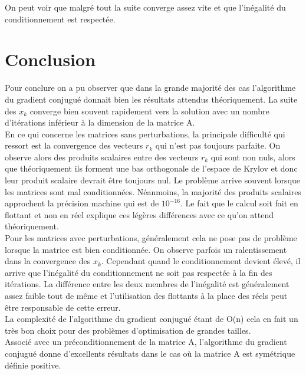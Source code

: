 \documentclass[12,french]{report}
\begin{document}
On peut voir que malgré tout la suite converge assez vite et que l'inégalité du conditionnement est respectée.

\chapter*{Conclusion}

Pour conclure on a pu observer que dans la grande majorité des cas l'algorithme du gradient conjugué donnait bien les résultats attendus théoriquement. La suite des $x_{k}$ converge bien souvent rapidement vers la solution avec un nombre d'itérations inférieur à la dimension de la matrice A.\\

En ce qui concerne les matrices sans perturbations, la principale difficulté qui ressort est la convergence des vecteurs $r_{k}$ qui n'est pas toujours parfaite. On observe alors des produits scalaires entre des vecteurs $r_{k}$ qui sont non nuls, alors que théoriquement ils forment une bas orthogonale de l'espace de Krylov et donc leur produit scalaire devrait être toujours nul. Le problème arrive souvent lorsque les matrices sont mal conditionnées. Néanmoins, la majorité des produits scalaires approchent la précision machine qui est de $10^{-16}$. Le fait que le calcul soit fait en flottant et non en réel explique ces légères différences avec ce qu'on attend théoriquement.\\

Pour les matrices avec perturbations, généralement cela ne pose pas de problème lorsque la matrice est bien conditionnée. On observe parfois un ralentissement dans la convergence des $x_{k}$. Cependant quand le conditionnement devient élevé, il arrive que l'inégalité du conditionnement ne soit pas respectée à la fin des itérations. La différence entre les deux membres de l'inégalité est généralement assez faible tout de même et l'utilisation des flottants à la place des réels peut être responsable de cette erreur.\\

La complexité de l'algorithme du gradient conjugué étant de O(n) cela en fait un très bon choix pour des problèmes d'optimisation de grandes tailles.\\
Associé avec un préconditionnement de la matrice A, l'algorithme du gradient conjugué donne d'excellents résultats dans le cas où la matrice A est symétrique définie positive. \\
\end{document}
